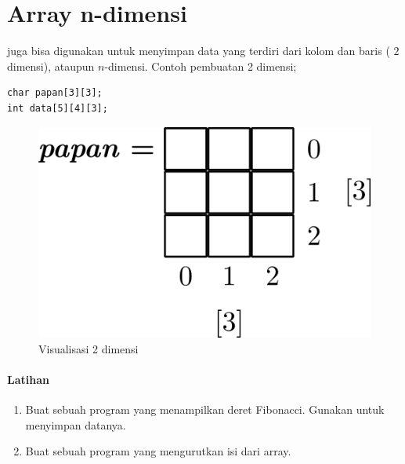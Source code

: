 \documentclass[../main.tex]{subfiles}
\begin{document}

\section{Array n-dimensi}
 juga bisa digunakan untuk menyimpan data yang terdiri dari kolom dan baris ( \(2\) dimensi), ataupun \(n\)-dimensi. Contoh pembuatan  2 dimensi;

\begin{verbatim}
char papan[3][3];
int data[5][4][3];
\end{verbatim}

\begin{figure}[h]
\centering
\includegraphics[scale=0.5]{img/array_2_vis}
\caption{Visualisasi  2 dimensi}
\label{arr:2vis}
\end{figure}

\paragraph{Latihan}
\begin{enumerate}
	\item Buat sebuah program yang menampilkan deret Fibonacci. Gunakan  untuk menyimpan datanya.
	\item Buat sebuah program yang mengurutkan isi dari array.
\end{enumerate}
\end{document}
